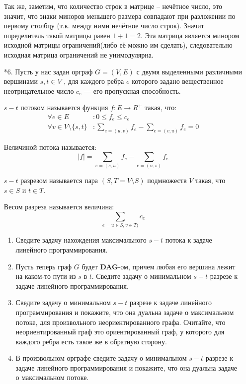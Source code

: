 \begin{enumerate}
	Так же, заметим, что количество строк в матрице -- нечётное число, это значит, что знаки миноров меньшего 
	размера совпадают при разложении по первому столбцу (т.к. между ними нечётное число строк). Значит 
	определитель такой матрицы равен $1 + 1 = 2$. Эта матрица является минором исходной матрицы ограничений(либо 
	её можно им сделать), следовательно исходная матрица ограничений не унимодулярна.
	
	\item[*6.] Пусть у нас задан орграф $G = (V, E)$ с двумя выделенными различными вершинами $s, t \in V$ , для 
	каждого ребра $e$ которого задано вещественное неотрицательное число $c_e$ — его пропускная способность.
	
	$s-t$ потоком называется функция $f : E \to R^+$ такая, что:
	\begin{align*}
		\forall e \in E&: 0 \leqslant f_e \leqslant c_e \\
		\forall v \in V \setminus \{s, t\} &: \sum\limits_{e = (u,v)} f_e - \sum\limits_{e = (v,u)} f_e = 0
	\end{align*}
	
	Величиной потока называется:
	\begin{equation*}
		|f| = \sum\limits_{e = (s, u)} f_e - \sum\limits_{e = (u, s)} f_e
	\end{equation*}
	
	$s-t$ разрезом называется пара $(S, T = V \setminus S)$ подмножеств $V$ такая, что $s \in S$ и $t \in T$. 
	
	Весом разреза называется величина:
	\begin{equation*}
		\sum\limits_{e = u\in S, v\in T)} c_e
	\end{equation*}
	
	\begin{enumerate}
		\item Сведите задачу нахождения максимального $s-t$ потока к задаче линейного программирования.
		\item Пусть теперь граф $G$ будет \textbf{DAG}-ом, причем любая его вершина лежит на каком-то пути из $s$ 
		в $t$. Сведите задачу о минимальном $s-t$ разрезе к задаче линейного программирования.
		\item Сведите задачу о минимальном $s-t$ разрезе к задаче линейного программирования и покажите, что она 
		дуальна задаче о максимальном потоке, для произвольного неориентированного графа. Считайте, что 
		неориентированный граф это ориентированный граф, у которого для каждого ребра есть такое же в обратную 
		сторону.
		\item В произвольном орграфе сведите задачу о минимальном $s-t$ разрезе к задаче линейного 
		программирования и покажите, что она дуальна задаче о максимальном потоке.
	\end{enumerate}
\end{enumerate}



